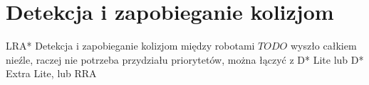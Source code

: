 \section{Detekcja i zapobieganie kolizjom}
\label{ch:alg-collision-avoid}

LRA*
Detekcja i zapobieganie kolizjom między robotami
$TODO$ wyszło całkiem nieźle, raczej nie potrzeba przydziału priorytetów, można łączyć z D* Lite lub D* Extra Lite, lub RRA